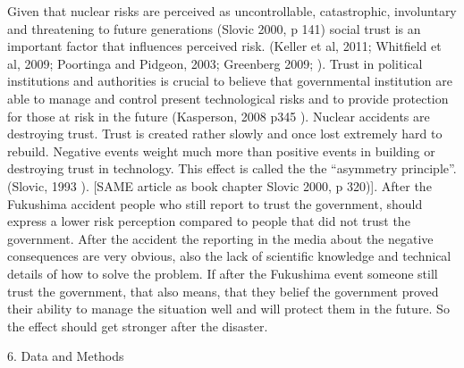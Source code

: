   
Given that nuclear risks are perceived as uncontrollable, catastrophic, involuntary and threatening to future generations (Slovic 2000, p 141)  social trust is an important factor that influences perceived risk. (Keller et al, 2011; Whitfield et al, 2009; Poortinga and Pidgeon, 2003; Greenberg 2009; \citep{Whitfield:2009ku,Poortinga:2003cb,Keller:2011gb, Greenberg:2009fx}). Trust in political institutions and authorities is crucial to believe that governmental institution are able to manage and control present technological risks and to provide protection for those at risk in the future (Kasperson, 2008 p345 \citep{Kasperson:2008tw}).  
Nuclear accidents are destroying trust. Trust is created rather slowly and once lost extremely hard to rebuild. Negative events weight much more than positive events in building or destroying trust in technology. This effect is called the the ``asymmetry principle''. (Slovic, 1993 \citep{Slovic:1993gm}). [SAME article as book chapter Slovic 2000, p 320)].  
After the Fukushima accident people who still report to trust the government, should express a lower risk perception compared to people that did not trust the government. After the accident the reporting in the media about the negative consequences are very obvious, also the lack of scientific knowledge and technical details of how to solve the problem. If after the Fukushima event someone still trust the government, that also means, that they belief the government proved their ability to manage the situation well and will protect them in the future. So the effect should get stronger after the disaster.

    

6. Data and Methods 



